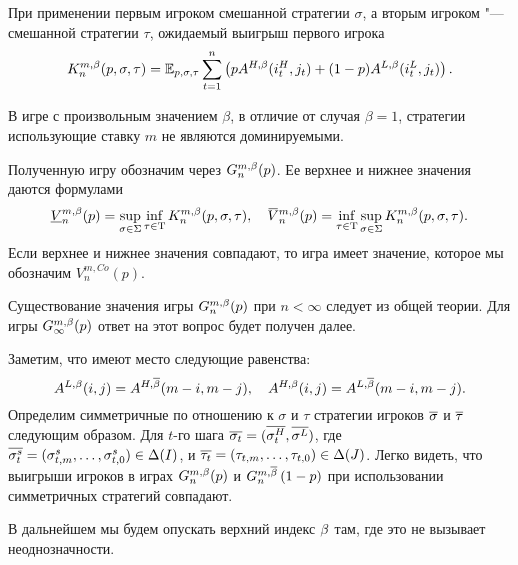 {При применении первым игроком смешанной стратегии $\sigma$, а вторым игроком
"--- смешанной стратегии $\tau$, ожидаемый выигрыш первого игрока
\begin{equation}
  \label{ch1:eq:firstPlayerPayoff}
  K^{m,\Co}_n(p, \sigma, \tau) = \E_{p,\sigma,\tau} \sum_{t=1}^n
  \left(
    pA^{H,\Co}(i_t^H, j_t) + (1 - p)A^{L,\Co}(i_t^L, j_t)
  \right).
\end{equation}
\begin{remark}
  В игре с произвольным значением $\beta$, в отличие от случая $\beta = 1$,
  стратегии использующие ставку $m$ не являются доминируемыми.
\end{remark}
Полученную игру обозначим через $G^{m,\Co}_n(p)$. Ее верхнее и нижнее
значения даются формулами
\begin{equation*}
  \underline{V}^{m,\Co}_n(p) = \sup_{\sigma \in \Sigma} \inf_{\tau \in \Tau}
  K^{m,\Co}_n(p, \sigma, \tau), \quad
  \overbar{V}^{m,\Co}_n(p) = \inf_{\tau \in \Tau} \sup_{\sigma \in \Sigma}
  K^{m,\Co}_n(p, \sigma, \tau).
\end{equation*}
Если верхнее и нижнее значения совпадают, то игра имеет значение, которое мы
обозначим $V^{m,Co}_n(p)$.

\begin{remark}
  Существование значения игры $G^{m,\Co}_n(p)$ при $n < \infty$ следует из
  общей теории. Для игры $G^{m,\Co}_\infty(p)$ ответ на этот вопрос будет
  получен далее.
\end{remark}

Заметим, что имеют место следующие равенства:
\begin{equation*}
  A^{L,\Co}(i, j) = A^{H,\DCo}(m-i, m-j), \quad
  A^{H,\Co}(i, j) = A^{L,\DCo}(m-i, m-j).
\end{equation*}
Определим симметричные по отношению к $\sigma$ и $\tau$ стратегии игроков
$\symm{\sigma}$ и $\symm{\tau}$ следующим образом. Для $t$-го шага
$\symm{\sigma_t} = (\symm{\sigma^H_t}, \symm{\sigma^L})$, где
$\symm{\sigma^s_t}=(\sigma^s_{t,m},\ldots,\sigma^s_{t,0}) \in \Delta(I)$, и
$\symm{\tau_t} = (\tau_{t,m},\ldots,\tau_{t,0}) \in \Delta(J)$. Легко видеть,
что выигрыши игроков в играх $G^{m,\Co}_n(p)$ и $\symmGameExpression[n]{1-p}$
при использовании симметричных стратегий совпадают.

В дальнейшем мы будем опускать верхний индекс $\Co$ там, где это не вызывает неоднозначности.

}
